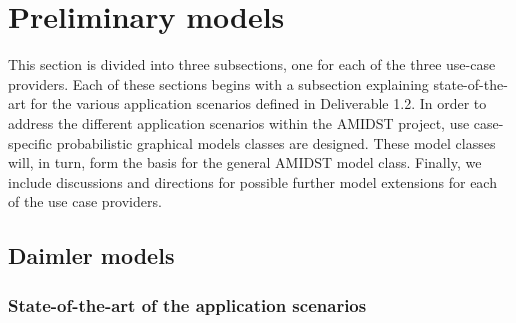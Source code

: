 \section{Preliminary models}\label{Section:PreliminaryModels}

This section is divided into three subsections, one for each of the three use-case providers. Each of these sections begins with a subsection explaining state-of-the-art for the various application scenarios defined in Deliverable
1.2. In order to address the different application scenarios within the AMIDST project, use case-specific probabilistic graphical
models classes are designed. These model classes will, in turn, form the basis for the general AMIDST model class. Finally, we include discussions and
directions for possible further model extensions for each of the use case providers.  




\subsection{Daimler models}\label{Section:DaimlerModels}

\subsubsection{State-of-the-art of the application scenarios}\label{Section:StateOfTheArt}

